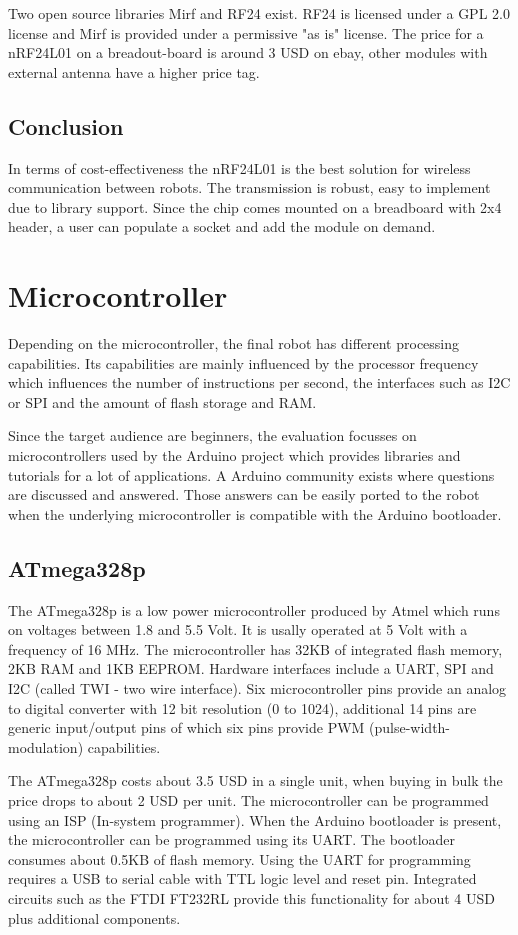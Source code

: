 Two open source libraries Mirf and RF24 exist. RF24 is licensed under a GPL 2.0 license and Mirf is provided under a permissive "as is" license. The price for a nRF24L01 on a breadout-board is around 3 USD on ebay, other modules with external antenna have a higher price tag.
\subsection{Conclusion}
In terms of cost-effectiveness the nRF24L01 is the best solution for wireless communication between robots. The transmission is robust, easy to implement due to library support. Since the chip comes mounted on a breadboard with 2x4 header, a user can populate a socket and add the module on demand.
\section{Microcontroller}
Depending on the microcontroller, the final robot has different processing capabilities. Its capabilities are mainly influenced by the processor frequency which influences the number of instructions per second, the interfaces such as I2C or SPI and the amount of flash storage and RAM.

Since the target audience are beginners, the evaluation focusses on microcontrollers used by the Arduino project which provides libraries and tutorials for a lot of applications. A Arduino community exists where questions are discussed and answered. Those answers can be easily ported to the robot when the underlying microcontroller is compatible with the Arduino bootloader.
\subsection{ATmega328p}
The ATmega328p is a low power microcontroller produced by Atmel which runs on voltages between 1.8 and 5.5 Volt. It is usally operated at 5 Volt with a frequency of 16 MHz. The microcontroller has 32KB of integrated flash memory, 2KB RAM and 1KB EEPROM. Hardware interfaces include a UART, SPI and I2C (called TWI - two wire interface). Six microcontroller pins provide an analog to digital converter with 12 bit resolution (0 to 1024), additional 14 pins are generic input/output pins of which six pins provide PWM (pulse-width-modulation) capabilities.

The ATmega328p costs about 3.5 USD in a single unit, when buying in bulk the price drops to about 2 USD per unit. The microcontroller can be programmed using an ISP (In-system programmer). When the Arduino bootloader is present, the microcontroller can be programmed using its UART. The bootloader consumes about 0.5KB of flash memory. Using the UART for programming requires a USB to serial cable with TTL logic level and reset pin. Integrated circuits such as the FTDI  FT232RL provide this functionality for about 4 USD plus additional components.
